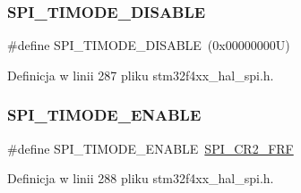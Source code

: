 \subsubsection{\texorpdfstring{S\+P\+I\+\_\+\+T\+I\+M\+O\+D\+E\+\_\+\+D\+I\+S\+A\+B\+LE}{SPI\_TIMODE\_DISABLE}}
{\footnotesize\ttfamily \#define S\+P\+I\+\_\+\+T\+I\+M\+O\+D\+E\+\_\+\+D\+I\+S\+A\+B\+LE~(0x00000000\+U)}



Definicja w linii 287 pliku stm32f4xx\+\_\+hal\+\_\+spi.\+h.

\mbox{\label{group___s_p_i___t_i__mode_ga8b31d4b25f951edd1dfd7cf6d4387517}} 
\subsubsection{\texorpdfstring{S\+P\+I\+\_\+\+T\+I\+M\+O\+D\+E\+\_\+\+E\+N\+A\+B\+LE}{SPI\_TIMODE\_ENABLE}}
{\footnotesize\ttfamily \#define S\+P\+I\+\_\+\+T\+I\+M\+O\+D\+E\+\_\+\+E\+N\+A\+B\+LE~\hyperlink{group___peripheral___registers___bits___definition_ga09e3f41fa2150831afaac191046087f2}{S\+P\+I\+\_\+\+C\+R2\+\_\+\+F\+RF}}



Definicja w linii 288 pliku stm32f4xx\+\_\+hal\+\_\+spi.\+h.

